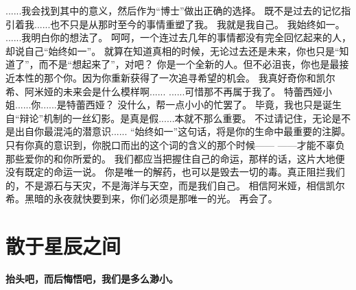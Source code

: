 \documentclass[openany]{book}
\begin{document}
\begin{dialogue}
     ......我会找到其中的意义，然后作为“博士”做出正确的选择。
     既不是过去的记忆指引着我......也不只是从那时至今的事情重塑了我。
     我就是我自己。
     我始终如一。
     ......我明白你的想法了。
     呵呵，一个连过去几年的事情都没有完全回忆起来的人，却说自己“始终如一”。
     就算在知道真相的时候，无论过去还是未来，你也只是“知道了”，而不是“想起来了”，对吧？
     你是一个全新的人。但不必沮丧，你也是最接近本性的那个你。因为你重新获得了一次追寻希望的机会。
     我真好奇你和凯尔希、阿米娅的未来会是什么模样啊......
     ......可惜那不再属于我了。
     特蕾西娅小姐......你......是特蕾西娅？
     没什么，帮一点小小的忙罢了。
     毕竟，我也只是诞生自“辩论”机制的一丝幻影。是真是假......本就不那么重要。
     不过请记住，无论是不是出自你最混沌的潜意识......
     “始终如一”这句话，将是你的生命中最重要的注脚。只有你真的意识到，你脱口而出的这个词的含义的那个时候——
     ——才能不辜负那些爱你的和你所爱的。
     我们都应当把握住自己的命运，那样的话，这片大地便没有既定的命运一说。
     你是唯一的解药，也可以是毁去一切的毒。真正阻拦我们的，不是源石与天灾，不是海洋与天空，而是我们自己。
     相信阿米娅，相信凯尔希。黑暗的永夜就快要到来，你们必须是那唯一的光。
     再会了。
\end{dialogue}

\chapter{散于星辰之间}
\begin{center} \textbf{抬头吧，而后悔悟吧，我们是多么渺小。}\end{center} \par
\clearpage
\end{document}
